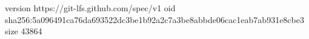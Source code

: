 version https://git-lfs.github.com/spec/v1
oid sha256:5a096491ca76da693522dc3be1b92a2c7a3be8abbde06cac1eab7ab931e8cbe3
size 43864
